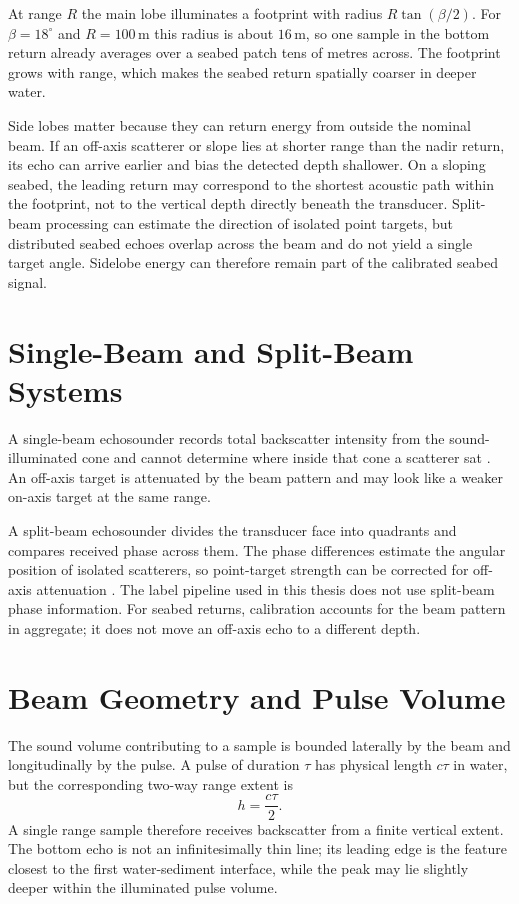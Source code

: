 At range $R$ the main lobe illuminates a footprint with radius $R\tan(\beta/2)$. For $\beta = 18^\circ$ and $R = 100\,\text{m}$ this radius is about $16\,\text{m}$, so one sample in the bottom return already averages over a seabed patch tens of metres across. The footprint grows with range, which makes the seabed return spatially coarser in deeper water.

Side lobes matter because they can return energy from outside the nominal beam. If an off-axis scatterer or slope lies at shorter range than the nadir return, its echo can arrive earlier and bias the detected depth shallower. On a sloping seabed, the leading return may correspond to the shortest acoustic path within the footprint, not to the vertical depth directly beneath the transducer. Split-beam processing can estimate the direction of isolated point targets, but distributed seabed echoes overlap across the beam and do not yield a single target angle. Sidelobe energy can therefore remain part of the calibrated seabed signal.

\section{Single-Beam and Split-Beam Systems}

A single-beam echosounder records total backscatter intensity from the sound-illuminated cone and cannot determine where inside that cone a scatterer sat \cite{demer_calibration_2015}. An off-axis target is attenuated by the beam pattern and may look like a weaker on-axis target at the same range.

A split-beam echosounder divides the transducer face into quadrants and compares received phase across them. The phase differences estimate the angular position of isolated scatterers, so point-target strength can be corrected for off-axis attenuation \cite{andersen_quantitative_2024,demer_calibration_2015,echoview_sonic_split_beam_compensation}. The label pipeline used in this thesis does not use split-beam phase information. For seabed returns, calibration accounts for the beam pattern in aggregate; it does not move an off-axis echo to a different depth.

\section{Beam Geometry and Pulse Volume}
\label{sec:beam_geometry}

The sound volume contributing to a sample is bounded laterally by the beam and longitudinally by the pulse. A pulse of duration $\tau$ has physical length $c\tau$ in water, but the corresponding two-way range extent is
\begin{equation}
    h = \frac{c\tau}{2}.
\end{equation}
A single range sample therefore receives backscatter from a finite vertical extent. The bottom echo is not an infinitesimally thin line; its leading edge is the feature closest to the first water-sediment interface, while the peak may lie slightly deeper within the illuminated pulse volume.

